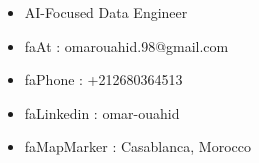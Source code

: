 \documentclass[10pt,a4paper,ragged2e,withhyper]{altacv}
\begin{document}
\makecvheader

\begin{itemize}[noitemsep]
\item AI-Focused Data Engineer
\item faAt : omarouahid.98@gmail.com
\item faPhone : +212680364513
\item faLinkedin : omar-ouahid
\item faMapMarker  : Casablanca, Morocco
\end{itemize}
\begin{minipage}{\textwidth}

\end{minipage}

\end{document}
